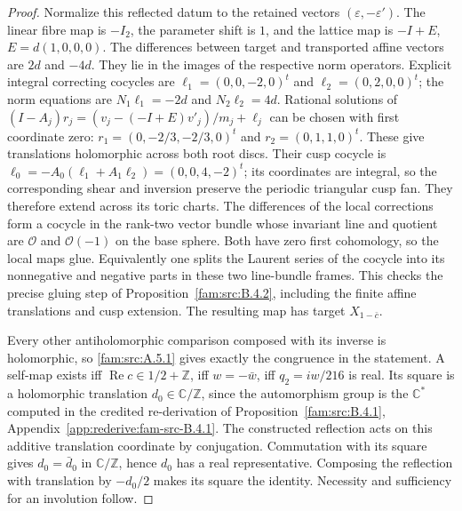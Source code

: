 \begin{proof}
Normalize this reflected datum to the retained vectors
$(\varepsilon,-\varepsilon')$. The linear fibre map is $-I_2$, the
parameter shift is $1$, and the lattice map is $-I+E$,
$E=d(1,0,0,0)$. The differences between target and transported affine
vectors are $2d$ and $-4d$. They lie in the images of the respective
norm operators. Explicit integral correcting cocycles are
$\ell_1=(0,0,-2,0)^t$ and $\ell_2=(0,2,0,0)^t$; the norm equations
are $N_1\ell_1=-2d$ and $N_2\ell_2=4d$. Rational solutions of
$(I-A_j)r_j=(v_j-(-I+E)v'_j)/m_j+\ell_j$ can be chosen with first
coordinate zero: $r_1=(0,-2/3,-2/3,0)^t$ and
$r_2=(0,1,1,0)^t$. These give translations holomorphic across both
root discs. Their cusp cocycle is
$\ell_0=-A_0(\ell_1+A_1\ell_2)=(0,0,4,-2)^t$; its coordinates are
integral, so the corresponding shear and inversion preserve the
periodic triangular cusp fan. They therefore extend across its toric
charts. The differences of the local corrections form a cocycle in
the rank-two vector bundle whose invariant line and quotient are
$\mathcal O$ and $\mathcal O(-1)$ on the base sphere. Both have zero
first cohomology, so the local maps glue. Equivalently one splits the
Laurent series of the cocycle into its nonnegative and negative
parts in these two line-bundle frames. This checks the precise
gluing step of Proposition~\ref{fam:src:B.4.2}, including the finite affine translations
and cusp extension. The resulting map has target $X_{1-\bar c}$.

Every other antiholomorphic comparison composed with its inverse is
holomorphic, so \cref{fam:src:A.5.1} gives exactly the congruence in the statement.
A self-map exists iff $\operatorname{Re}c\in1/2+\mathbb Z$, iff
$w=-\bar w$, iff $q_2=iw/216$ is real. Its square is a holomorphic
translation $d_0\in\mathbb C/\mathbb Z$, since the automorphism group
is the $\mathbb C^*$ computed in the credited re-derivation
of Proposition~\ref{fam:src:B.4.1}, Appendix~\ref{app:rederive:fam-src-B.4.1}. The constructed reflection acts on
this additive translation coordinate by conjugation. Commutation
with its square gives $d_0=\bar d_0$ in $\mathbb C/\mathbb Z$, hence
$d_0$ has a real representative. Composing the reflection with
translation by $-d_0/2$ makes its square the identity. Necessity and
sufficiency for an involution follow.
\end{proof}